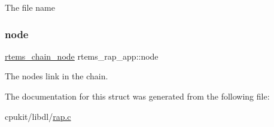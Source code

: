 The file name \mbox{\label{structrtems__rap__app_a10111874ef249901072c2133cc2029bd}} 
\subsubsection{\texorpdfstring{node}{node}}
{\footnotesize\ttfamily \mbox{\hyperlink{structChain__Node__struct}{rtems\+\_\+chain\+\_\+node}} rtems\+\_\+rap\+\_\+app\+::node}

The node\textquotesingle{}s link in the chain. 

The documentation for this struct was generated from the following file\+:\begin{DoxyCompactItemize}
\item 
cpukit/libdl/\mbox{\hyperlink{rap_8c}{rap.\+c}}\end{DoxyCompactItemize}
